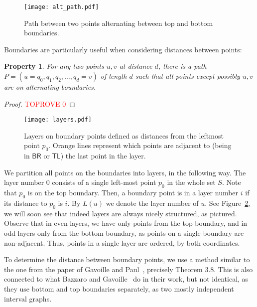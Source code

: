 \documentclass[a4paper,11pt]{article}
\newcommand{\BR}{\mathsf{BR}}
\newcommand{\TL}{\mathsf{TL}}
\newtheorem{property}[theorem]{Property}
\begin{document}
\begin{figure}[h]
\begin{center}
  \texttt{[image: alt\_path.pdf]}
\end{center}
\caption{Path between two points alternating between top and bottom boundaries.}
\label{Fig:AltPaths}
\end{figure}

Boundaries are particularly useful when considering distances between points:
\begin{property}
For any two points $u,v$ at distance $d$, there is a path $P=(u=q_0,q_1,q_2,\ldots,q_d=v)$ of length $d$
such that all points except possibly $u,v$ are on alternating boundaries.
\label{Prop:Bounds}
\end{property}
\begin{proof}\textcolor{red}{TOPROVE 0}\end{proof}

\begin{figure}[h]
\begin{center}
  \texttt{[image: layers.pdf]}
\end{center}
\caption{Layers on boundary points defined as distances from the leftmost point $p_0$.
Orange lines represent which points are adjacent to (being in $\BR$ or $\TL$) the last point in the layer.}
\label{Fig:Layers}
\end{figure}

We partition all points on the boundaries into layers, in the following way.
The layer number $0$ consists of a single left-most point $p_0$ in the whole set $S$.
Note that $p_0$ is on the top boundary.
Then, a boundary point is in a layer number $i$ if its distance to $p_0$ is $i$.
By $L(u)$ we denote the layer number of $u$.
See Figure~\ref{Fig:Layers}, we will soon see that indeed layers are always nicely structured, as pictured.
Observe that in even layers, we have only points from the top boundary, and in odd layers only from the bottom boundary,
as points on a single boundary are non-adjacent.
Thus, points in a single layer are ordered, by both coordinates.

To determine the distance between boundary points, we use a method similar to the one from the paper of
Gavoille and Paul~\cite{GavInterval}, precisely Theorem 3.8.
This is also connected to what Bazzaro and Gavoille~\cite{BazzaroG05} do in their work, but not identical,
as they use bottom and top boundaries separately, as two mostly independent interval graphs.
\end{document}
